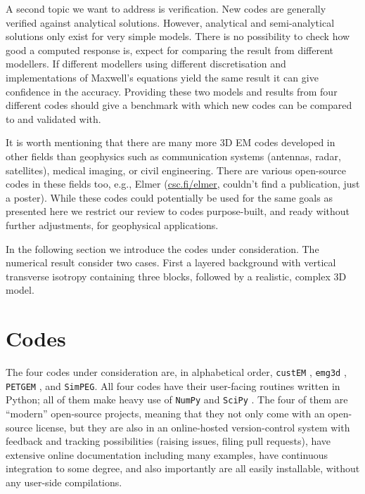 \documentclass[
    paper,
  ]{geophysics}
\newcommand{\emg}[2]{\texttt{emg#1#2}\xspace}
\newcommand{\simpeg}{\texttt{SimPEG}\xspace}
\newcommand{\custem}{\texttt{custEM}\xspace}
\newcommand{\petgem}{\texttt{PETGEM}\xspace}
\newcommand{\mycom}[2][]{
  \todo[color=yellow]{\textbf{\uppercase{[#1]}}:~#2}}
\begin{document}
A second topic we want to address is verification. New codes are generally
verified against analytical solutions. However, analytical and semi-analytical
solutions only exist for very simple models. There is no possibility to check
how good a computed response is, expect for comparing the result from different
modellers. If different modellers using different discretisation and
implementations of Maxwell's equations yield the same result it can give
confidence in the accuracy. Providing these two models and results from four
different codes should give a benchmark with which new codes can be compared to
and validated with.

It is worth mentioning that there are many more 3D EM codes developed in other
fields than geophysics such as communication systems (antennas, radar,
satellites), medical imaging, or civil engineering. There are various
open-source codes in these fields too, e.g., Elmer \mycom[DW]{Add 2-3 proper
references} (\href{http://www.csc.fi/elmer}{csc.fi/elmer}, couldn't find a
publication, just a poster). While these codes could potentially be used for
the same goals as presented here we restrict our review to codes purpose-built,
and ready without further adjustments, for geophysical applications.

In the following section we introduce the codes under consideration. The
numerical result consider two cases. First a layered background with vertical
transverse isotropy containing three blocks, followed by a realistic, complex
3D model.

\clearpage  %
\section{Codes}

The four codes under consideration are, in alphabetical order, \custem
\citep{GEO.19.Rochlitz}, \emg3d \citep{JOSS.19.Werthmuller}, \petgem
\citep{GJI.19.CastilloReyes}, and \simpeg \citep{CAG.15.Cockett}. All four
codes have their user-facing routines written in Python; all of them make heavy
use of \texttt{NumPy} \citep{CSE.11.VanDerWalt} and \texttt{SciPy}
\citep{NM.20.Virtanen}. The four of them are “modern” open-source projects,
meaning that they not only come with an open-source license, but they are also
in an online-hosted version-control system with feedback and tracking
possibilities (raising issues, filing pull requests), have extensive online
documentation including many examples, have continuous integration to some
degree, and also importantly are all easily installable, without any user-side
compilations.
\end{document}
